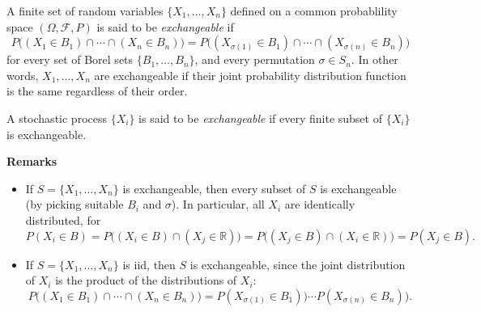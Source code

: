 \documentclass[12pt]{article}
\begin{document}
A finite set of random variables $\lbrace X_1,\ldots,X_n \rbrace$ defined on a common probablility space $(\Omega, \mathcal{F}, P)$ is said to be \emph{exchangeable} if 
$$P\big((X_1\in B_1)\cap\cdots\cap(X_n\in B_n)\big)=P\big((X_{\sigma(1)}\in B_1)\cap\cdots\cap(X_{\sigma(n)}\in B_n)\big)$$
for every set of Borel sets $\lbrace B_1,\ldots, B_n\rbrace$, and every permutation $\sigma\in S_n$.  In other words, $X_1,\ldots,X_n$ are exchangeable if their joint probability distribution function is the same regardless of their order.

A stochastic process $\lbrace X_i\rbrace$ is said to be \emph{exchangeable} if every finite subset of $\lbrace X_i\rbrace$ is exchangeable.

\textbf{Remarks}
\begin{itemize}
\item If $S=\lbrace X_1,\ldots,X_n \rbrace$ is exchangeable, then every subset of $S$ is exchangeable (by picking suitable $B_i$ and $\sigma$).  In particular, all $X_i$ are identically distributed, for 
$$P(X_i\in B)=P\big((X_i\in B)\cap(X_j\in \mathbb{R})\big)=P\big((X_j\in B)\cap(X_i\in \mathbb{R})\big)=P(X_j\in B).$$
\item If $S=\lbrace X_1,\ldots,X_n\rbrace$ is iid, then $S$ is exchangeable, since the joint distribution of $X_i$ is the product of the distributions of $X_i$: $$P\big((X_1\in B_1)\cap\cdots\cap(X_n\in B_n)\big)=P(X_{\sigma(1)}\in B_1)\big)\cdots P(X_{\sigma(n)}\in B_n)\big).$$
\end{itemize}
\end{document}
